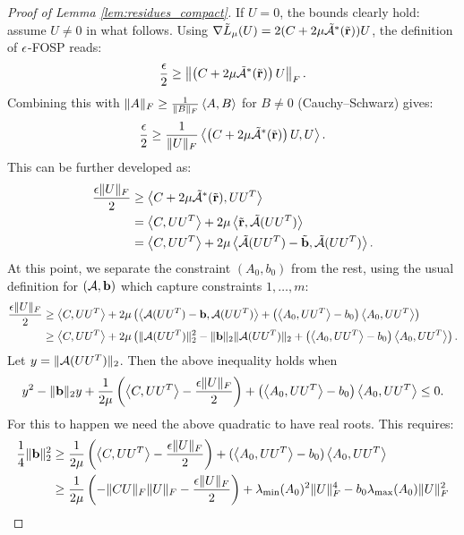 \begin{proof}[Proof of Lemma \ref{lem:residues_compact}]
	If $U = 0$, the bounds clearly hold: assume $U \neq 0$ in what follows.
	Using $\nabla \tilde L_\mu(U) = 2( C + 2\mu\tilde {\mathcal{A}}^*(\tilde {\mathbf{r}}) )U$, the definition of $\epsilon$-FOSP reads:
	\begin{align*}
		\frac{\epsilon}{2} \geq \left\| \left( C + 2\mu\tilde {\mathcal{A}}^*(\tilde {\mathbf{r}}) \right) U \right\|_F.
	\end{align*}
	Combining this with $\|A\|_F \geq \frac{1}{\|B\|_F} \left\langle A, B \right\rangle$ for $B\neq 0$ (Cauchy--Schwarz) gives:
	\begin{align*}
		\frac{\epsilon}{2} \geq \frac{1}{\|U\|_F} \left\langle \left( C + 2\mu\tilde {\mathcal{A}}^*(\tilde {\mathbf{r}}) \right) U, U \right\rangle.
	\end{align*}
	This can be further developed as:
	\begin{align}
		\frac{\epsilon \|U\|_F}{2} & \geq \left\langle C + 2\mu\tilde {\mathcal{A}}^*(\tilde {\mathbf{r}}), UU^T \right\rangle \nonumber\\
		& = \left\langle C, UU^T \right\rangle + 2\mu \left\langle \tilde{\mathbf{r}}, \tilde{\mathcal{A}}(UU^T) \right\rangle \nonumber\\
		& = \left\langle C, UU^T \right\rangle + 2\mu \left\langle \tilde {\mathcal{A}}(UU^T) - \tilde {\mathbf{b}}, \tilde {\mathcal{A}}(UU^T) \right\rangle. \label{eq:residueboundintermediate}
	\end{align}
	At this point, we separate the constraint $(A_0, b_0)$ from the rest, using the usual definition for $(\mathcal{A}, \mathbf{b})$ which capture constraints $1, \ldots, m$:
	\begin{align*}
		\frac{\epsilon \|U\|_F}{2} & \geq \left\langle C, UU^T \right\rangle+2\mu\left( \left\langle \mathcal{A}(UU^T)-\mathbf{b}, \mathcal{A}(UU^T) \right\rangle+ \left(\left\langle A_0, UU^T \right\rangle-b_0\right)\left\langle A_0, UU^T \right\rangle \right) \\
		& \geq \left\langle C, UU^T \right\rangle + 2\mu\left( \|\mathcal{A}(UU^T)\|_2^2-\|\mathbf{b}\|_2 \|\mathcal{A}(UU^T)\|_2 + \left(\left\langle A_0, UU^T \right\rangle-b_0\right)\left\langle A_0, UU^T \right\rangle \right).
	\end{align*}
	Let $y =\|\mathcal{A}(UU^T)\|_2$. Then the above inequality holds when
	$$
	y^2 -\|\mathbf{b}\|_2 y +\frac{1}{2\mu}\left( \left\langle C, UU^T \right\rangle-\frac{\epsilon \|U\|_F}{2} \right)+  \left(\left\langle A_0, UU^T \right\rangle-b_0\right)\left\langle A_0, UU^T \right\rangle  \leq 0.
	$$
	For this to happen we need the above quadratic to have real roots. This requires:
	\begin{align*}
	\frac{1}{4}\|\vb\|_2^2 & \geq \frac{1}{2\mu}\left( \ip{C}{UU^T}-\frac{\eps \|U\|_F}{2} \right)+  (\ip{A_0}{UU^T}-\bz)\ip{A_0}{UU^T} \\
	& \geq\frac{1}{2\mu}\left( -\|CU\|_F \|U\|_F-\frac{\eps \|U\|_F}{2} \right)+  \lambda_{\min}(A_0)^2 \|U\|_F^4-\bz \lambda_{\max}(A_0) \|U\|_F^2 \\

\end{align*}
\end{proof}
